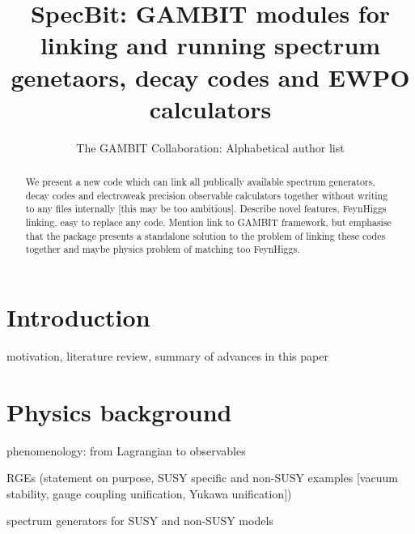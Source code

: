 \documentclass[11pt,a4paper]{article}
\title{SpecBit: GAMBIT modules for linking and running spectrum genetaors, decay codes and EWPO calculators}
\author{The GAMBIT Collaboration: Alphabetical author list} %
\begin{document}
\maketitle

\begin{abstract}
We present a new code which can link all publically available spectrum generators, decay codes and electroweak precision observable calculators together without writing to any files internally [this may be too ambitious]. Describe novel features, FeynHiggs linking, easy to replace any code. Mention link to GAMBIT framework, but emphasise that the package presents a standalone solution to the problem of linking these codes together and maybe physics problem of matching too FeynHiggs.
\end{abstract}

\tableofcontents


\section{Introduction}
motivation, literature review, summary of advances in this paper



\section{Physics background}

phenomenology: from Lagrangian to observables

RGEs (statement on purpose, SUSY specific and non-SUSY examples [vacuum stability, gauge coupling unification, Yukawa unification])

spectrum generators for SUSY and non-SUSY models
 
\end{document}
